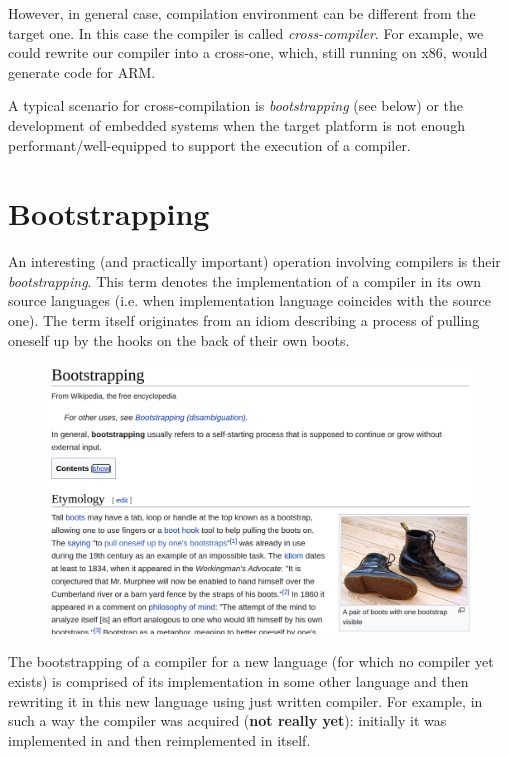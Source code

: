 However, in general case, compilation environment can be different from the target one. In this case the compiler is called
\emph{cross-compiler}. For example, we could rewrite our \lama compiler into a cross-one, which, still running on x86,
would generate code for ARM.

A typical scenario for cross-compilation is \emph{bootstrapping} (see below) or the development of embedded systems when
the target platform is not enough performant/well-equipped to support the execution of a compiler.

\section{Bootstrapping}

An interesting (and practically important) operation involving compilers is their \emph{bootstrapping}. This term denotes the
implementation of a compiler in its own source languages (i.e. when implementation language coincides with the source one).
The term itself originates from an idiom describing a process of pulling oneself up by the hooks on the back of their own
boots.

\begin{figure}[h]
  \centering
  \includegraphics[scale=0.2]{images/bootstrapping.png}
\end{figure}

The bootstrapping of a compiler for a new language (for which no compiler yet exists) is comprised of its implementation
in some other language and then rewriting it in this new language using just written compiler. For example, in such a way the \lama compiler was
acquired (\textbf{not really yet}): initially it was implemented in  and then reimplemented in
\lama itself.

